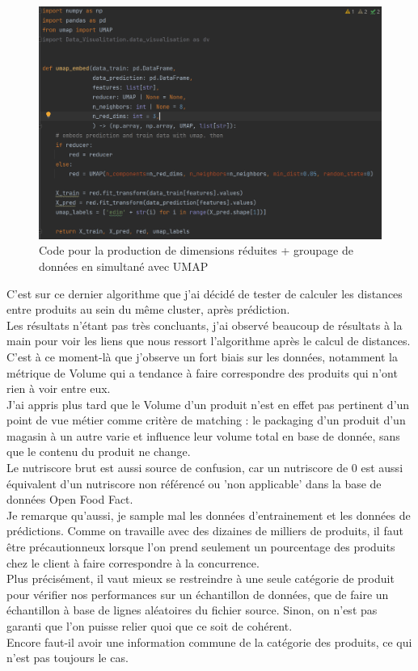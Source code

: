 \documentclass{rapportCS}
\begin{document}
\begin{figure}[h!]
  \centerline{\includegraphics[width=20cm]{images/code_umap.png}}
  \caption{\label{Code umap} Code pour la production de dimensions réduites + groupage de données en simultané avec UMAP}
  \end{figure}

C'est sur ce dernier algorithme que j'ai décidé de tester de calculer les distances
entre produits au sein du même cluster, après prédiction.\\

Les résultats n'étant pas très concluants, j'ai observé beaucoup de résultats à
la main pour voir les liens que nous ressort l'algorithme après le calcul de distances.\\
C'est à ce moment-là que j'observe un fort biais sur les données, notamment la métrique de Volume
qui a tendance à faire correspondre des produits qui n'ont rien à voir entre eux.\\
J'ai appris plus tard que le Volume d'un produit n'est en effet pas pertinent d'un point de vue métier comme 
critère de matching : le packaging d'un produit d'un magasin à un autre varie et influence leur volume total
en base de donnée, sans que le contenu du produit ne change.\\
Le nutriscore brut est aussi source de confusion, car un nutriscore de 0 est aussi équivalent d'un nutriscore
non référencé ou 'non applicable' dans la base de données Open Food Fact.\\

Je remarque qu'aussi, je sample mal les données d'entrainement et les données de prédictions.
Comme on travaille avec des dizaines de milliers de produits, il faut être précautionneux lorsque l'on
prend seulement un pourcentage des produits chez le client à faire correspondre à la concurrence.\\
Plus précisément, il vaut mieux se restreindre à une seule catégorie de produit pour vérifier nos
performances sur un échantillon de données, que de faire un échantillon à base de lignes aléatoires
du fichier source. Sinon, on n'est pas garanti que l'on puisse relier quoi que ce soit de cohérent.\\
Encore faut-il avoir une information commune de la catégorie des produits, ce qui n'est pas toujours
le cas.\\
\end{document}
